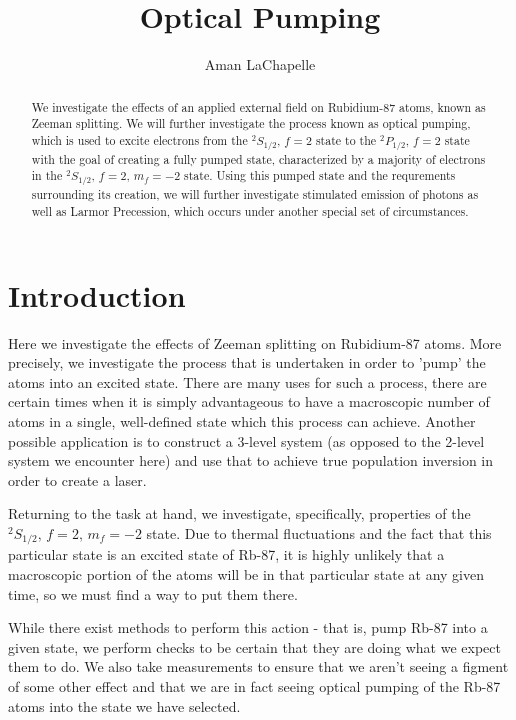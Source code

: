 \documentclass{article}
\title{Optical Pumping}
\author{Aman LaChapelle}
\newcommand{\twohalfmf}[2]{$^2 #1_{1/2},\, f = 2,\, m_f = #2$}
\newcommand{\twohalf}[1]{$^2 #1_{1/2},\, f = 2$}
\begin{document}
\raggedright
\maketitle

\begin{abstract}
  We investigate the effects of an applied external field on Rubidium-87 atoms, known as Zeeman splitting.  We will further investigate the process known as optical pumping, which is used to excite electrons from the \twohalf{S} state to the \twohalf{P} state with the goal of creating a fully pumped state, characterized by a majority of electrons in the \twohalfmf{S}{-2} state.  Using this pumped state and the requrements surrounding its creation, we will further investigate stimulated emission of photons as well as Larmor Precession, which occurs under another special set of circumstances.
\end{abstract}

\tableofcontents
\newpage

\section{Introduction}%
  Here we investigate the effects of Zeeman splitting on Rubidium-87 atoms.  More precisely, we investigate the process that is undertaken in order to 'pump' the atoms into an excited state.  There are many uses for such a process, there are certain times when it is simply advantageous to have a macroscopic number of atoms in a single, well-defined state which this process can achieve.  Another possible application is to construct a 3-level system (as opposed to the 2-level system we encounter here) and use that to achieve true population inversion in order to create a laser.

  Returning to the task at hand, we investigate, specifically, properties of the \twohalfmf{S}{-2} state.  Due to thermal fluctuations and the fact that this particular state is an excited state of Rb-87, it is highly unlikely that a macroscopic portion of the atoms will be in that particular state at any given time, so we must find a way to put them there.

  While there exist methods to perform this action - that is, pump Rb-87 into a given state, we perform checks to be certain that they are doing what we expect them to do.  We also take measurements to ensure that we aren't seeing a figment of some other effect and that we are in fact seeing optical pumping of the Rb-87 atoms into the state we have selected.
\end{document}

